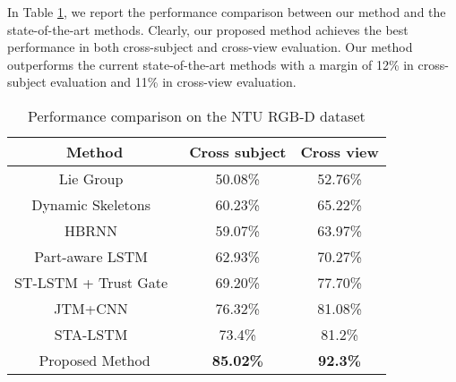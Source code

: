 \documentclass[10pt,journal]{IEEEtran}
\begin{document}
In Table \ref{tab:NTU}, we report the performance comparison between our method and the state-of-the-art methods. Clearly, our proposed method achieves the best performance in both cross-subject and cross-view evaluation. Our method outperforms the current state-of-the-art methods with a margin of 12\% in cross-subject evaluation and 11\% in cross-view evaluation.

\begin{table}[htb]
\begin{center}
\caption{Performance comparison on the NTU RGB-D dataset \cite{Shahroudy2016NTU}} \label{tab:NTU}
\begin{tabular}{  c  c  c }
\hline
Method              &Cross subject &Cross view \\
\hline
Lie Group~\cite{Vemulapalli2014Human} & 50.08\% & 52.76\% \\
Dynamic Skeletons~\cite{Ohnbar2013Joint} &60.23\% &65.22\% \\
HBRNN~\cite{Du2015Hierarchical} &59.07\% &63.97\% \\
Part-aware LSTM~\cite{Shahroudy2016NTU} &62.93\% &70.27\% \\
ST-LSTM + Trust Gate~\cite{Liu2016Spatio} &69.20\% & 77.70\% \\
JTM+CNN~\cite{Wang2016Action} & 76.32\% &81.08\% \\
STA-LSTM~\cite{Song2016An} &73.4\% &81.2\% \\
Proposed Method     & \bf{85.02\%} &\bf{92.3\%} \\
\hline
\end{tabular}
\end{center}
\end{table}
\end{document}
